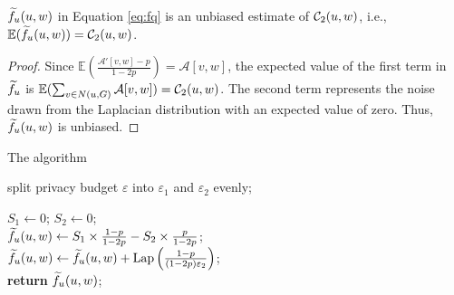 \begin{lemma}
\label{thm:fq.biase}
$\widetilde{f}_u(u,w)$ in Equation \ref{eq:fq} is an unbiased estimate of $\mathcal{C}_2(u,w)$, i.e., 
$\mathbb{E}(\widetilde{f}_u(u,w)) = \mathcal{C}_2(u,w)$. 
\end{lemma}
\begin{proof}
Since $\mathbb{E}(\frac{\mathcal{A}'[v,w]-p}{1-2p})  = \mathcal{A}[v,w]$, the expected value of the first term in $\widetilde{f}_u$ is $\mathbb{E}( \sum_{v \in N(u, G)} \mathcal{A}[v,w]) = \mathcal{C}_2(u,w)$. 
The second term represents the noise drawn from the Laplacian distribution with an expected value of zero. Thus, $\widetilde{f}_u(u,w)$ is unbiased. 
\end{proof}

\begin{algorithm}[tbh]
    \small
	\caption{The \advss algorithm}
	\label{algo:adv1}
	\LinesNumbered
        split privacy budget $\varepsilon$ into $\varepsilon_1$ and $\varepsilon_2$ evenly;\\
        
            $S_1 \gets 0$; $S_2 \gets 0$;\\
        $\widetilde{f}_u(u, w) \gets S_1 \times \frac{1-p}{1-2p} - S_2 \times \frac{p}{1-2p}$;\\
        $ \widetilde{f}_u(u, w) \gets \widetilde{f}_u(u, w) + \text{Lap}\left(\frac{1-p}{(1-2p) \varepsilon_2}\right)$;\\
	\textbf{return} $\widetilde{f}_u(u, w) $;\\
\end{algorithm}

